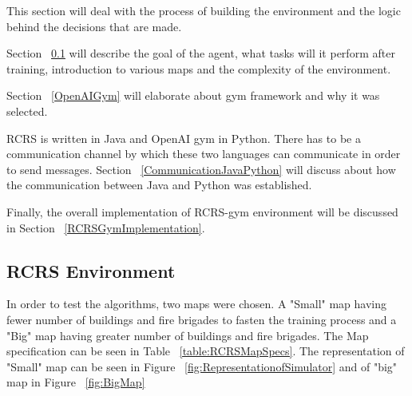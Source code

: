 \documentclass[12pt]{report}
\begin{document}
This section will deal with the process of building the environment and the logic behind the decisions that are made. 

Section ~\ref{RCRSEnvironment} will describe the goal of the agent, what tasks will it perform after training, introduction to various maps and the complexity of the environment. 

Section ~\ref{OpenAIGym} will elaborate about gym framework and why it was selected.

RCRS is written in Java and OpenAI gym in Python. There has to be a communication channel by which these two languages can communicate in order to send messages. Section ~\ref{CommunicationJavaPython} will discuss about how the communication between Java and Python was established. 

Finally, the overall implementation of RCRS-gym environment will be discussed in Section ~\ref{RCRSGymImplementation}. 





\subsection{RCRS Environment} \label{RCRSEnvironment}


In order to test the algorithms, two maps were chosen. A "Small" map having fewer number of buildings and fire brigades to fasten the training process and a "Big" map having greater number of buildings and fire brigades. The Map specification can be seen in Table ~\ref{table:RCRSMapSpecs}. The representation of "Small" map can be seen in Figure ~\ref{fig:RepresentationofSimulator} and of "big" map in Figure ~\ref{fig:BigMap}
\end{document}
